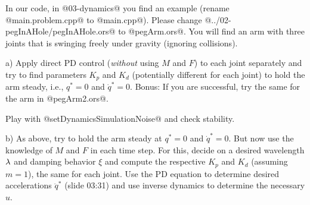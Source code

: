 In our code, in @03-dynamics@ you find an example (rename
@main.problem.cpp@ to @main.cpp@). Please change
@../02-pegInAHole/pegInAHole.ors@ to @pegArm.ors@. You will find an
arm with three joints that is swinging freely under gravity (ignoring
collisions).

a) Apply direct PD control (\emph{without} using $M$ and $F$) to each
joint separately and try to find parameters $K_p$ and $K_d$
(potentially different for each joint) to hold the arm steady, i.e.,
$q^*=0$ and $\dot q^*=0$. Bonus: If you are successful, try the same for the
arm in @pegArm2.ors@.

Play with @setDynamicsSimulationNoise@ and check stability.


b) As above, try to hold the arm steady at $q^*=0$ and $\dot q^*=0$. But
now use the knowledge of $M$ and $F$ in each time step. For this,
decide on a desired wavelength $\lambda$ and damping behavior $\xi$ and
compute the respective $K_p$ and $K_d$ (assuming $m=1$), the same for
each joint. Use the PD equation to determine desired accelerations
$\ddot q^*$ (slide 03:31) and use inverse dynamics to determine the
necessary $u$.






